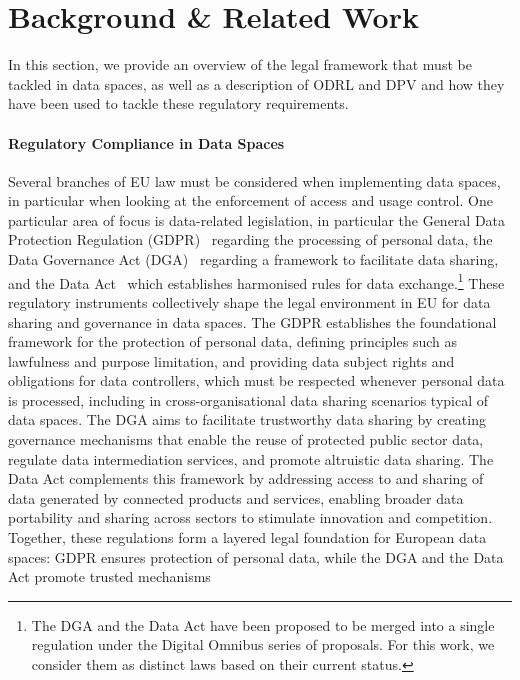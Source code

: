 \section{Background \& Related Work}
\label{sec:background}

In this section,
we provide an overview of the legal framework
that must be tackled in data spaces,
as well as a description of ODRL and DPV
and how they have been used
to tackle these regulatory requirements.

\paragraph{Regulatory Compliance in Data Spaces}

Several branches of EU law must be considered
when implementing data spaces,
in particular when looking at the
enforcement of access and usage control.
One particular area of focus is
data-related legislation,
in particular the
General Data Protection Regulation (GDPR)~\cite{gdpr}
regarding the processing of personal data,
the Data Governance Act (DGA)~\cite{dga}
regarding a framework to facilitate data sharing,
and the Data Act~\cite{data_act}
which establishes harmonised rules for data exchange.\footnote{
The DGA and the Data Act have been proposed to be merged
into a single regulation under the Digital Omnibus series
of proposals. For this work, we consider them as distinct
laws based on their current status.
}
These regulatory instruments
collectively shape the legal environment in EU
for data sharing and governance in data spaces.
The GDPR establishes the foundational framework
for the protection of personal data,
defining principles such as lawfulness and purpose limitation,
and providing data subject rights
and obligations for data controllers,
which must be respected whenever personal data is processed,
including in cross-organisational data sharing scenarios typical of data spaces.
The DGA aims to facilitate trustworthy data sharing
by creating governance mechanisms that enable the reuse of
protected public sector data,
regulate data intermediation services,
and promote altruistic data sharing.
The Data Act complements this framework
by addressing access to and sharing of data
generated by connected products and services,
enabling broader data portability and sharing
across sectors to stimulate innovation and competition.
Together,
these regulations form a layered legal foundation
for European data spaces:
GDPR ensures protection of personal data,
while the DGA and the Data Act promote trusted mechanisms
